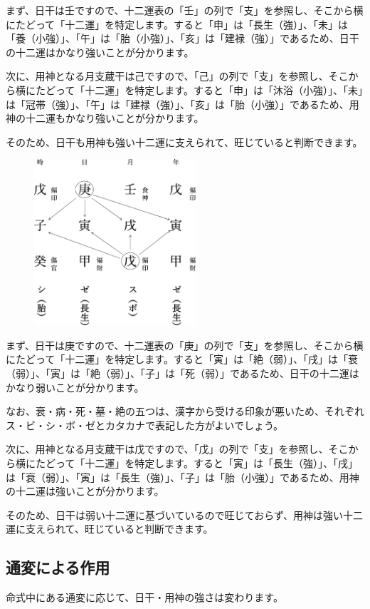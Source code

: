 \documentclass[a5paper,11pt,dvipdfmx]{tarticle}
\begin{document}
まず、日干は壬ですので、十二運表の「壬」の列で「支」を参照し、そこから横にたどって「十二運」を特定します。すると「申」は「長生（強）」、「未」は「養（小強）」、「午」は「胎（小強）」、「亥」は「建禄（強）」であるため、日干の十二運はかなり強いことが分かります。

次に、用神となる月支蔵干は己ですので、「己」の列で「支」を参照し、そこから横にたどって「十二運」を特定します。すると「申」は「沐浴（小強）」、「未」は「冠帯（強）」、「午」は「建禄（強）」、「亥」は「胎（小強）」であるため、用神の十二運もかなり強いことが分かります。

そのため、日干も用神も強い十二運に支えられて、旺じていると判断できます。

\begin{figure}[h]
  \includegraphics[width=60mm,angle=90]{figs/figure6-5.eps}
\end{figure}

まず、日干は庚ですので、十二運表の「庚」の列で「支」を参照し、そこから横にたどって「十二運」を特定します。すると「寅」は「絶（弱）」、「戌」は「衰（弱）」、「寅」は「絶（弱）」、「子」は「死（弱）」であるため、日干の十二運はかなり弱いことが分かります。

なお、衰・病・死・墓・絶の五つは、漢字から受ける印象が悪いため、それぞれス・ビ・シ・ボ・ゼとカタカナで表記した方がよいでしょう。

次に、用神となる月支蔵干は戊ですので、「戊」の列で「支」を参照し、そこから横にたどって「十二運」を特定します。すると「寅」は「長生（強）」、「戌」は「衰（弱）」、「寅」は「長生（強）」、「子」は「胎（小強）」であるため、用神の十二運は強いことが分かります。

そのため、日干は弱い十二運に基づいているので旺じておらず、用神は強い十二運に支えられて、旺じていると判断できます。

\subsection{通変による作用}
命式中にある通変に応じて、日干・用神の強さは変わります。
\end{document}
